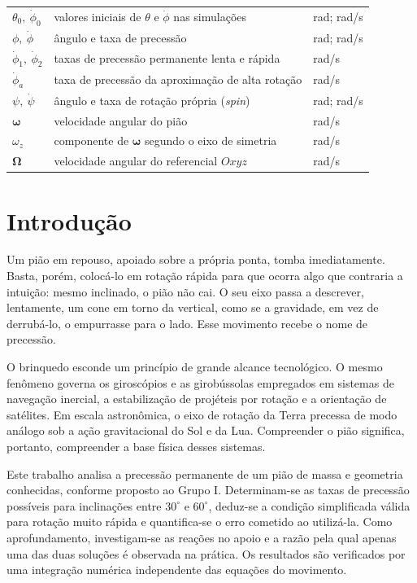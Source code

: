 \documentclass[12pt,a4paper]{article}
\newcommand{\vomega}{\boldsymbol{\omega}}
\newcommand{\vOmega}{\boldsymbol{\Omega}}
\newcommand{\phid}{\dot{\phi}}
\newcommand{\psid}{\dot{\psi}}
\begin{document}
{\begin{tabular}{@{}l p{9.3cm} l@{}}
$\theta_0,\ \phid_0$ & valores iniciais de $\theta$ e $\phid$ nas simulações & rad; rad/s\\
$\phi,\ \phid$ & ângulo e taxa de precessão & rad; rad/s\\
$\phid_1,\ \phid_2$ & taxas de precessão permanente lenta e rápida & rad/s\\
$\phid_a$ & taxa de precessão da aproximação de alta rotação & rad/s\\
$\psi,\ \psid$ & ângulo e taxa de rotação própria (\textit{spin}) & rad; rad/s\\
$\vomega$ & velocidade angular do pião & rad/s\\
$\omega_z$ & componente de $\vomega$ segundo o eixo de simetria & rad/s\\
$\vOmega$ & velocidade angular do referencial $Oxyz$ & rad/s\\
\bottomrule
\end{tabular}
}
\clearpage


\section{Introdução}

Um pião em repouso, apoiado sobre a própria ponta, tomba imediatamente. Basta, porém, colocá-lo em rotação rápida para que ocorra algo que contraria a intuição: mesmo inclinado, o pião não cai. O seu eixo passa a descrever, lentamente, um cone em torno da vertical, como se a gravidade, em vez de derrubá-lo, o empurrasse para o lado. Esse movimento recebe o nome de precessão.

O brinquedo esconde um princípio de grande alcance tecnológico. O mesmo fenômeno governa os giroscópios e as girobússolas empregados em sistemas de navegação inercial, a estabilização de projéteis por rotação e a orientação de satélites. Em escala astronômica, o eixo de rotação da Terra precessa de modo análogo sob a ação gravitacional do Sol e da Lua. Compreender o pião significa, portanto, compreender a base física desses sistemas.

Este trabalho analisa a precessão permanente de um pião de massa e geometria conhecidas, conforme proposto ao Grupo I. Determinam-se as taxas de precessão possíveis para inclinações entre $30^\circ$ e $60^\circ$, deduz-se a condição simplificada válida para rotação muito rápida e quantifica-se o erro cometido ao utilizá-la. Como aprofundamento, investigam-se as reações no apoio e a razão pela qual apenas uma das duas soluções é observada na prática. Os resultados são verificados por uma integração numérica independente das equações do movimento.
\end{document}
